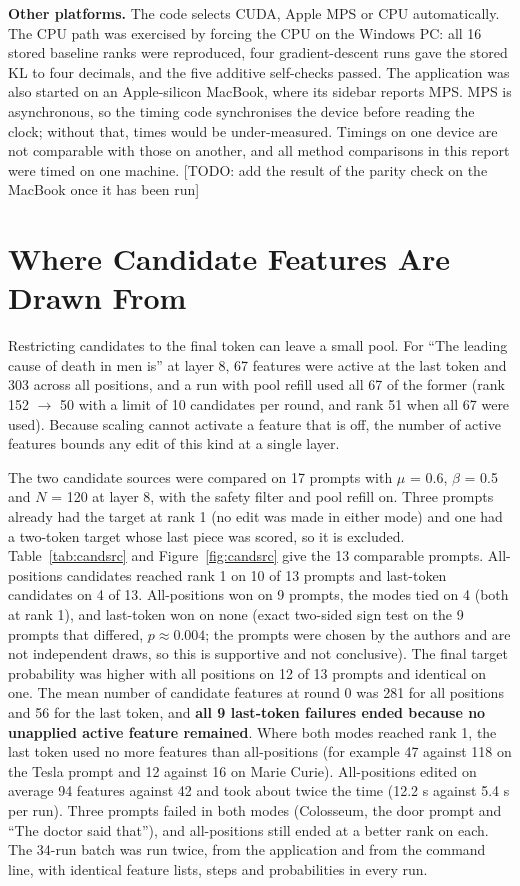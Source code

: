 \documentclass[12pt,a4paper]{report}
\newcommand{\todo}[1]{{\color{red}[TODO: #1]}}
\begin{document}
\textbf{Other platforms.} The code selects CUDA, Apple MPS or CPU automatically. The CPU path was exercised by forcing the CPU on the Windows PC: all 16 stored baseline ranks were reproduced, four gradient-descent runs gave the stored KL to four decimals, and the five additive self-checks passed. The application was also started on an Apple-silicon MacBook, where its sidebar reports MPS. MPS is asynchronous, so the timing code synchronises the device before reading the clock; without that, times would be under-measured. Timings on one device are not comparable with those on another, and all method comparisons in this report were timed on one machine. \todo{add the result of the parity check on the MacBook once it has been run}


\section{Where Candidate Features Are Drawn From}\label{sec:candsrc}

Restricting candidates to the final token can leave a small pool. For ``The leading cause of death in men is'' at layer 8, 67 features were active at the last token and 303 across all positions, and a run with pool refill used all 67 of the former (rank 152 $\rightarrow$ 50 with a limit of 10 candidates per round, and rank 51 when all 67 were used). Because scaling cannot activate a feature that is off, the number of active features bounds any edit of this kind at a single layer.

The two candidate sources were compared on 17 prompts with $\mu$ = 0.6, $\beta$ = 0.5 and $N$ = 120 at layer 8, with the safety filter and pool refill on. Three prompts already had the target at rank 1 (no edit was made in either mode) and one had a two-token target whose last piece was scored, so it is excluded. Table~\ref{tab:candsrc} and Figure~\ref{fig:candsrc} give the 13 comparable prompts. All-positions candidates reached rank 1 on 10 of 13 prompts and last-token candidates on 4 of 13. All-positions won on 9 prompts, the modes tied on 4 (both at rank 1), and last-token won on none (exact two-sided sign test on the 9 prompts that differed, $p \approx 0.004$; the prompts were chosen by the authors and are not independent draws, so this is supportive and not conclusive). The final target probability was higher with all positions on 12 of 13 prompts and identical on one. The mean number of candidate features at round 0 was 281 for all positions and 56 for the last token, and \textbf{all 9 last-token failures ended because no unapplied active feature remained}. Where both modes reached rank 1, the last token used no more features than all-positions (for example 47 against 118 on the Tesla prompt and 12 against 16 on Marie Curie). All-positions edited on average 94 features against 42 and took about twice the time (12.2 s against 5.4 s per run). Three prompts failed in both modes (Colosseum, the door prompt and ``The doctor said that''), and all-positions still ended at a better rank on each. The 34-run batch was run twice, from the application and from the command line, with identical feature lists, steps and probabilities in every run.
\end{document}
